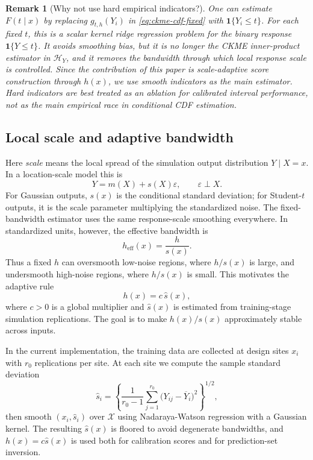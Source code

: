\documentclass[11pt]{article}
\newtheorem{remark}{Remark}
\newcommand{\Xcal}{\mathcal X}
\newcommand{\Hcal}{\mathcal H}
\newcommand{\ind}{\mathbf 1}
\begin{document}
\begin{remark}[Why not use hard empirical indicators?]
One can estimate \(F(t\mid x)\) by replacing \(g_{t,h}(Y_i)\) in \eqref{eq:ckme-cdf-fixed} with \(\ind\{Y_i\le t\}\). For each fixed \(t\), this is a scalar kernel ridge regression problem for the binary response \(\ind\{Y\le t\}\). It avoids smoothing bias, but it is no longer the CKME inner-product estimator in \(\Hcal_Y\), and it removes the bandwidth through which local response scale is controlled. Since the contribution of this paper is scale-adaptive score construction through \(h(x)\), we use smooth indicators as the main estimator. Hard indicators are best treated as an ablation for calibrated interval performance, not as the main empirical race in conditional CDF estimation.
\end{remark}

\subsection{Local scale and adaptive bandwidth}

Here \emph{scale} means the local spread of the simulation output distribution \(Y\mid X=x\). In a location-scale model this is
\[
  Y=m(X)+s(X)\varepsilon,\qquad \varepsilon\perp X.
\]
For Gaussian outputs, \(s(x)\) is the conditional standard deviation; for Student-\(t\) outputs, it is the scale parameter multiplying the standardized noise. The fixed-bandwidth estimator uses the same response-scale smoothing everywhere. In standardized units, however, the effective bandwidth is
\[
  h_{\mathrm{eff}}(x)=\frac{h}{s(x)}.
\]
Thus a fixed \(h\) can oversmooth low-noise regions, where \(h/s(x)\) is large, and undersmooth high-noise regions, where \(h/s(x)\) is small. This motivates the adaptive rule
\begin{equation}
  h(x)=c\,\widehat s(x),
  \label{eq:adaptive-rule}
\end{equation}
where \(c>0\) is a global multiplier and \(\widehat s(x)\) is estimated from training-stage simulation replications. The goal is to make \(h(x)/s(x)\) approximately stable across inputs.

In the current implementation, the training data are collected at design sites \(x_i\) with \(r_0\) replications per site. At each site we compute the sample standard deviation
\[
  \widehat s_i=
  \left\{\frac{1}{r_0-1}\sum_{j=1}^{r_0}
  \bigl(Y_{ij}-\overline Y_i\bigr)^2\right\}^{1/2},
\]
then smooth \((x_i,\widehat s_i)\) over \(\Xcal\) using Nadaraya-Watson regression with a Gaussian kernel. The resulting \(\widehat s(x)\) is floored to avoid degenerate bandwidths, and \(h(x)=c\widehat s(x)\) is used both for calibration scores and for prediction-set inversion.
\end{document}
